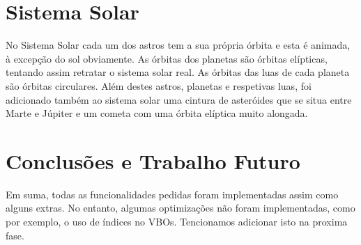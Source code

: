 \documentclass[a4paper]{article}
\begin{document}
\section{Sistema Solar}

No Sistema Solar cada um dos astros tem a sua própria órbita e esta é animada, à excepção do sol obviamente.
As órbitas dos planetas são órbitas elípticas, tentando assim retratar o sistema solar real. As órbitas das luas de cada planeta são órbitas circulares.
Além destes astros, planetas e respetivas luas, foi adicionado também ao sistema solar uma cintura de asteróides que se situa entre Marte e Júpiter e um cometa com uma órbita elíptica muito alongada.

\section{Conclusões e Trabalho Futuro}

Em suma, todas as funcionalidades pedidas foram implementadas assim como alguns extras. No entanto, algumas optimizações não foram implementadas, como por exemplo, o uso de índices no VBOs. Tencionamos adicionar isto na proxima fase.
\end{document}
